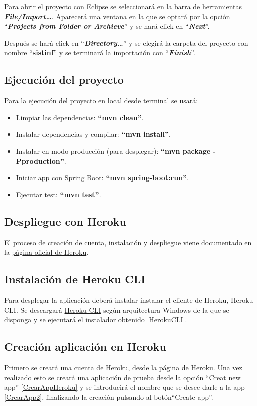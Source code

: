 Para abrir el proyecto con Eclipse se seleccionará en la barra de herramientas \textbf{\textit{File/Import\dots}}. Aparecerá una ventana en la que se optará por la opción ``\textbf{\textit{Projects from Folder or Archieve}}'' y se hará click en ``\textbf{\textit{Next}}''.

Después se hará click en ``\textbf{\textit{Directory\dots}}'' y se elegirá la carpeta del proyecto con nombre ``\textbf{sistinf}'' y se terminará la importación con ``\textbf{\textit{Finish}}''.
	
\subsection{Ejecución del proyecto}

Para la ejecución del proyecto en local desde terminal se usará:
\begin{itemize}
	\item Limpiar las dependencias: \textbf{``mvn clean''}.
	\item Instalar dependencias y compilar: \textbf{``mvn install''}.
	\item Instalar en modo producción (para desplegar): \textbf{``mvn package -Pproduction''}. 
	\item Iniciar app con Spring Boot:  \textbf{``mvn spring-boot:run''}. 
	\item Ejecutar test: \textbf{``mvn test''}.	
\end{itemize}

\subsection{Despliegue con Heroku}
El proceso de creación de cuenta, instalación y despliegue viene documentado en la \href{https://devcenter.heroku.com/articles/getting-started-with-java}{página oficial de Heroku}.

\subsection{Instalación de Heroku CLI}
Para desplegar la aplicación deberá instalar instalar el cliente de Heroku, Heroku CLI. Se descargará \href{https://devcenter.heroku.com/articles/heroku-cli#download-and-install}{Heroku CLI} según arquitectura Windows de la que se disponga y se ejecutará el instalador obtenido \ref{HerokuCLI}.


\subsection{Creación aplicación en Heroku}
Primero se creará una cuenta de Heroku, desde la página de \href{https://dashboard.heroku.com/}{Heroku}. Una vez realizado esto se creará una aplicación de prueba desde la opción ``Creat new app'' \ref{CrearAppHeroku} y se introducirá el nombre que se desee darle a la app \ref{CrearApp2}, finalizando la creación pulsando al botón``Create app''. 

